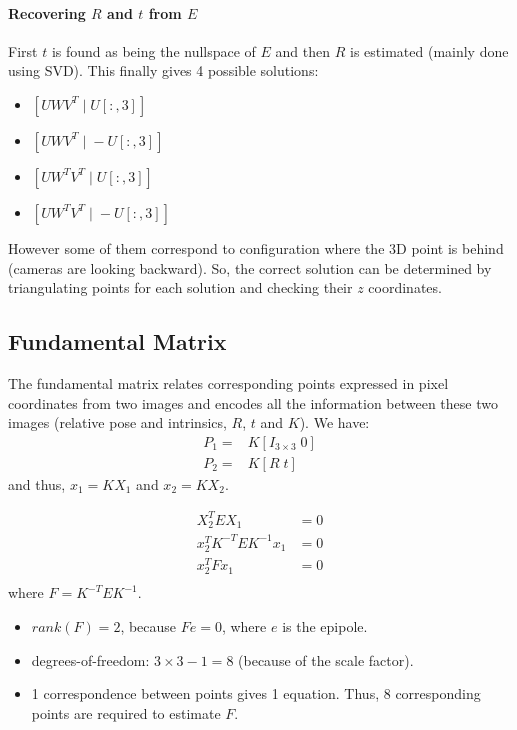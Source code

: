 \paragraph{Recovering $R$ and $t$ from $E$}
First $t$ is found as being the nullspace of $E$ and then $R$ is estimated (mainly done using SVD). This finally gives 4 possible solutions:
\begin{itemize}
    \item $[UWV^T \;|\; U[:,3]]$
    \item $[UWV^T \;|\; -U[:,3]]$
    \item $[UW^TV^T \;|\; U[:,3]]$
    \item $[UW^TV^T \;|\; -U[:,3]]$
\end{itemize}

However some of them correspond to configuration where the 3D point is behind (cameras are looking backward). So, the correct solution can be determined by triangulating points for each solution and checking their $z$ coordinates.



\subsection{Fundamental Matrix}

The fundamental matrix relates corresponding points expressed in pixel coordinates from two images and encodes all the information between these two images (relative pose and intrinsics, $R$, $t$ and $K$).
We have:
\begin{equation}
    \begin{split}
        P_1=&K[I_ {3\times3}\;0] \\
        P_2=&K[R\;t]
    \end{split}
\end{equation}
and thus, $x_1 = K X_1$ and $x_2 = K X_2$.

\begin{equation}
\begin{split}
    X_2^T E X_1 &= 0 \\
    x_2^T K^{-T} E K^{-1} x_1 &= 0 \\
    x_2^T F x_1 &= 0\\
\end{split}
\end{equation}
where $F = K^{-T} E K^{-1}$.

\begin{itemize}
    \item $rank(F) = 2$, because $Fe=0$, where $e$ is the epipole.
    \item degrees-of-freedom: $3\times 3-1=8$ (because of the scale factor).
    \item 1 correspondence between points gives 1 equation. Thus, 8 corresponding points are required to estimate $F$.
\end{itemize}


